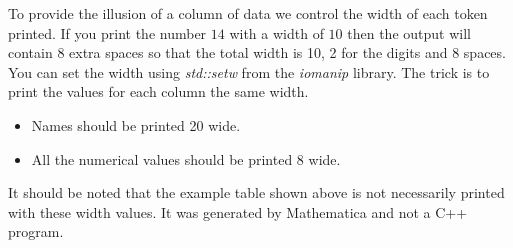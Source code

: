 \documentclass[]{tufte-handout}
\begin{document}
To provide the illusion of a column of data we control the width of each token printed. If you print the number $14$ with a width of $10$ then the output will contain $8$ extra spaces so that the total width is 10, 2 for the digits and 8 spaces. You can set the width using \textit{std::setw} from the \textit{iomanip} library.  The trick is to print the values for each column the same width. 
\begin{itemize}
\item Names should be printed 20 wide.
\item All the numerical values should be printed 8 wide.
\end{itemize}
It should be noted that the example table shown above is not necessarily printed with these width values. It was generated by Mathematica and not a C++ program.  
\end{document}
